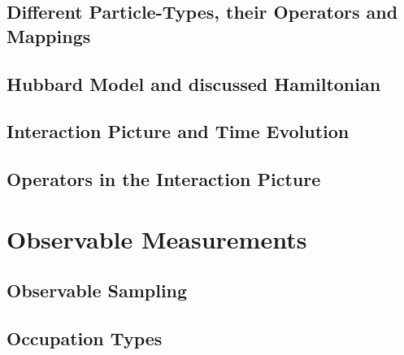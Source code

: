 \documentclass[
headings=optiontohead,              %
12pt,                               %
DIV=13,                             %
twoside=false,                      %
open=right,                         %
BCOR=00mm,                          %
toc=bibliographynumbered            %
]{scrreport}
\begin{document}
        \subsection{Different Particle-Types, their Operators and Mappings}
        \label{sec:particles}
        
        \FloatBarrier

        \subsection{Hubbard Model and discussed Hamiltonian}
        \label{sec:theory-hubbard-hamiltonian}
        
        \FloatBarrier

        
        \subsection{Interaction Picture and Time Evolution}
        \label{sec:theory-interaction-picture}
        
        \FloatBarrier
        
        \subsection{Operators in the Interaction Picture}
        \label{sec:theory-approximation-evaluation}
        
        \FloatBarrier

    \section{Observable Measurements}
    \label{sec:theory-observables}
    
    \FloatBarrier

        \subsection{Observable Sampling}
        \label{sec:theory-observables-sampling}
        
        \FloatBarrier

        \subsection{Occupation Types}
        \label{sec:theory-observables-occupations}
        
        \FloatBarrier
\end{document}
